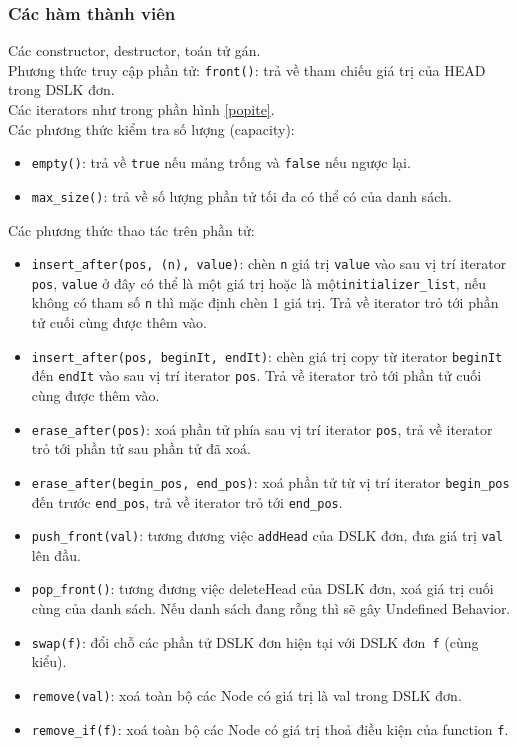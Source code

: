 \subsubsection{Các hàm thành viên}
Các constructor, destructor, toán tử gán.\\
Phương thức truy cập phần tử: \lstinline{front()}: trả về tham chiếu giá trị của HEAD trong DSLK đơn. \\
Các iterators như trong phần hình \ref{popite}.\\
Các phương thức kiểm tra số lượng (capacity):
\begin{itemize}
    \item \lstinline{empty()}: trả về \lstinline{true} nếu mảng trống và \lstinline{false} nếu ngược lại.
    \item \lstinline{max_size()}: trả về số lượng phần tử tối đa có thể có của danh sách.
\end{itemize}
Các phương thức thao tác trên phần tử:
\begin{itemize} 
    \item \lstinline{insert_after(pos, (n), value)}: chèn \lstinline{n} giá trị \lstinline{value} vào sau vị trí iterator \lstinline{pos}, \lstinline{value} ở đây có thể là một giá trị hoặc là một\lstinline{initializer_list}, nếu không có tham số \lstinline{n} thì mặc định chèn 1 giá trị. Trả về iterator trỏ tới phần tử cuối cùng được thêm vào.
    \item \lstinline{insert_after(pos, beginIt, endIt)}: chèn giá trị copy từ iterator \lstinline{beginIt} đến \lstinline{endIt} vào sau vị trí iterator \lstinline{pos}. Trả về iterator trỏ tới phần tử cuối cùng được thêm vào.
    \item \lstinline{erase_after(pos)}: xoá phần tử phía sau vị trí iterator \lstinline{pos}, trả về iterator trỏ tới phần tử sau phần tử đã xoá.
    \item \lstinline{erase_after(begin_pos, end_pos)}: xoá phần tử từ vị trí iterator \lstinline{begin_pos} đến trước \lstinline{end_pos}, trả về iterator trỏ tới \lstinline{end_pos}.
    \item \lstinline{push_front(val)}: tương đương việc \lstinline{addHead} của DSLK đơn, đưa giá trị \lstinline{val} lên đầu.
    \item \lstinline{pop_front()}: tương đương việc deleteHead của DSLK đơn, xoá giá trị cuối cùng của danh sách. Nếu danh sách đang rỗng thì sẽ gây Undefined Behavior.
    \item \lstinline{swap(f)}: đổi chỗ các phần tử DSLK đơn hiện tại với DSLK đơn\lstinline{ f} (cùng kiểu).
    \item \lstinline{remove(val)}: xoá toàn bộ các Node có giá trị là val trong DSLK đơn.
    \item \lstinline{remove_if(f)}: xoá toàn bộ các Node có giá trị thoả điều kiện của function \lstinline{f}.
\end{itemize}
